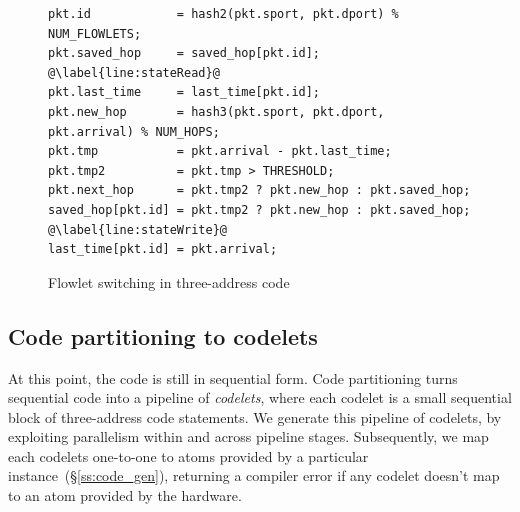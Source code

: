 \begin{figure}
\begin{lstlisting}[style=customc]
pkt.id            = hash2(pkt.sport, pkt.dport) % NUM_FLOWLETS;
pkt.saved_hop     = saved_hop[pkt.id]; @\label{line:stateRead}@
pkt.last_time     = last_time[pkt.id];
pkt.new_hop       = hash3(pkt.sport, pkt.dport, pkt.arrival) % NUM_HOPS;
pkt.tmp           = pkt.arrival - pkt.last_time;
pkt.tmp2          = pkt.tmp > THRESHOLD;
pkt.next_hop      = pkt.tmp2 ? pkt.new_hop : pkt.saved_hop;
saved_hop[pkt.id] = pkt.tmp2 ? pkt.new_hop : pkt.saved_hop; @\label{line:stateWrite}@
last_time[pkt.id] = pkt.arrival;
\end{lstlisting}
\caption{Flowlet switching in three-address code}
\label{fig:three_address}
\end{figure}

\subsection{Code partitioning to codelets}
\label{ss:partitioning}
At this point, the code is still in sequential form. Code partitioning turns
sequential code into a pipeline of \textit{codelets}, where each codelet is a
small sequential block of three-address code statements. We generate this
pipeline of codelets, by exploiting parallelism within and across pipeline
stages. Subsequently, we map each codelets one-to-one to atoms provided by a
particular \absmachine instance~(\S\ref{ss:code_gen}), returning a compiler
error if any codelet doesn't map to an atom provided by the hardware.

